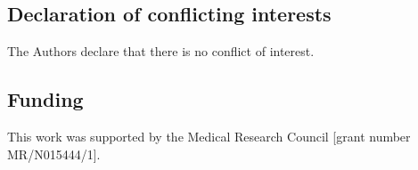 \documentclass[AMA,STIX1COL]{WileyNJD-v2}
\begin{document}





\subsection*{Declaration of conflicting interests}

The Authors declare that there is no conflict of interest.

\subsection*{Funding}

This work was supported by the Medical Research Council [grant number MR/N015444/1].

%

\end{document}
